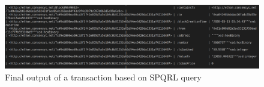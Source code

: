  \begin{center}
 	
 	\begin{figure}[htb!]
 		
 		\begin{minipage}{0.55\linewidth}
 			\centering
 			\includegraphics[width=1.55\textwidth]{images/chap03_output_final.png}
 		\end{minipage}
 		\caption{Final output of a transaction based on SPQRL query}
 		
 	\end{figure}
 	
 \end{center}
 